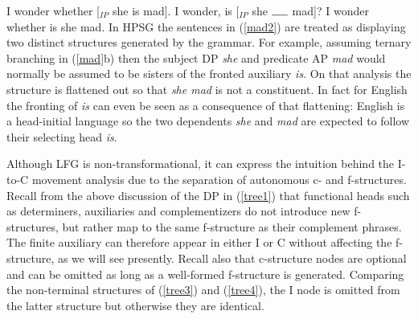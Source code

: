 \eal 
\label{mad2}
\ex  I wonder whether [$_{IP}$ she is mad]. 
\ex  I wonder,  is  [$_{IP}$ she $\rule{0.5cm}{0.15mm}$ mad]?
\ex  *I wonder whether is she mad.
\zl
In HPSG the sentences in (\ref{mad2}) are treated as displaying two distinct structures generated by the grammar.  For example, assuming ternary branching in (\ref{mad}b) then the subject DP \textit{she} and predicate AP \textit{mad} would normally be assumed to be sisters of the fronted auxiliary \textit{is}.  On that analysis the structure is flattened out so that \textit{she mad} is not a constituent.  In fact for English the fronting of \textit{is} can even be seen as a consequence of that flattening:  English is a head-initial language so the two dependents \textit{she} and \textit{mad} are expected to follow their selecting head \textit{is}.  

Although LFG is non-transformational, it can express the intuition behind the I-to-C movement analysis due to  the separation of autonomous c- and f-structures.  Recall from the above discussion of the DP in (\ref{tree1}) that functional heads such as determiners, auxiliaries and complementizers do not introduce new f-structures, but rather map to the same f-structure as their complement phrases.   The finite auxiliary can therefore appear in either I or C without affecting the f-structure, as we will see presently.  Recall also that c-structure nodes are optional and can be omitted as long as a well-formed f-structure is generated.  Comparing the non-terminal structures of (\ref{tree3}) and (\ref{tree4}), the I node is omitted from the latter structure but otherwise they are identical.   

\begin{exe}
\ex \label{tree3} 
\end{exe}

